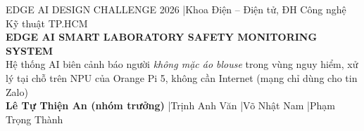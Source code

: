 \documentclass[24pt]{extarticle}
\begin{document}
\pagecolor{paper}
\begin{tcolorbox}[enhanced,colback=navy,colframe=navy,arc=5mm,left=12mm,right=12mm,top=3mm,bottom=3mm,before skip=0pt,after skip=0pt]
{\color{white}\raggedright
{\fontsize{20}{24}\selectfont\color{white!78!navy} EDGE AI DESIGN CHALLENGE 2026 \enspace|\enspace Khoa Điện -- Điện tử, ĐH Công nghệ Kỹ thuật TP.HCM}\\[0.5mm]
{\fontsize{34}{39}\selectfont\bfseries EDGE AI SMART LABORATORY SAFETY MONITORING SYSTEM}\\[0.5mm]
{\fontsize{20}{24}\selectfont Hệ thống AI biên cảnh báo người \emph{không mặc áo blouse} trong vùng nguy hiểm, xử lý tại chỗ trên NPU của Orange Pi 5, không cần Internet (mạng chỉ dùng cho tin Zalo)}\\[1mm]
{\fontsize{20}{24}\selectfont\textbf{Lê Tự Thiện An (nhóm trưởng)} \enspace|\enspace Trịnh Anh Văn \enspace|\enspace Võ Nhật Nam \enspace|\enspace Phạm Trọng Thành}}
\end{tcolorbox}
\end{document}
